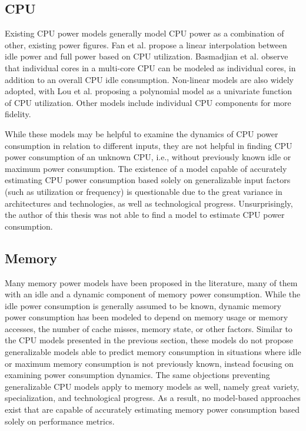 \subsection{CPU}

Existing CPU power models generally model CPU power as a combination of other, existing power figures. Fan et al.\parencite{fan2007power} propose a linear interpolation between idle power and full power based on CPU utilization. Basmadjian et al.\parencite{basmadjianMethodologyPredictPower2011} observe that individual cores in a multi-core CPU can be modeled as individual cores, in addition to an overall CPU idle consumption. Non-linear models are also widely adopted, with Lou et al.\parencite{LuoEnergyModeling2014} proposing a polynomial model as a univariate function of CPU utilization. Other models include individual CPU components\parencite{basmadjian2012evaluating, sarood2014maximizing} for more fidelity.

While these models may be helpful to examine the dynamics of CPU power consumption in relation to different inputs, they are not helpful in finding CPU power consumption of an unknown CPU, i.e., without previously known idle or maximum power consumption. The existence of a model capable of accurately estimating CPU power consumption based solely on generalizable input factors (such as utilization or frequency) is questionable due to the great variance in architectures and technologies, as well as technological progress. Unsurprisingly, the author of this thesis was not able to find a model to estimate CPU power consumption.

\subsection{Memory}

Many memory power models have been proposed in the literature, many of them with an idle and a dynamic component of memory power consumption. While the idle power consumption is generally assumed to be known, dynamic memory power consumption has been modeled to depend on memory usage\parencite{lin2018cloud} or memory accesses\parencite{arroba2014server}, the number of cache misses\parencite{kansal2010virtual}, memory state\parencite{basmadjianMethodologyPredictPower2011}, or other factors. Similar to the CPU models presented in the previous section, these models do not propose generalizable models able to predict memory consumption in situations where idle or maximum memory consumption is not previously known, instead focusing on examining power consumption dynamics. The same objections preventing generalizable CPU models apply to memory models as well, namely great variety, specialization, and technological progress. As a result, no model-based approaches exist that are capable of accurately estimating memory power consumption based solely on performance metrics.

